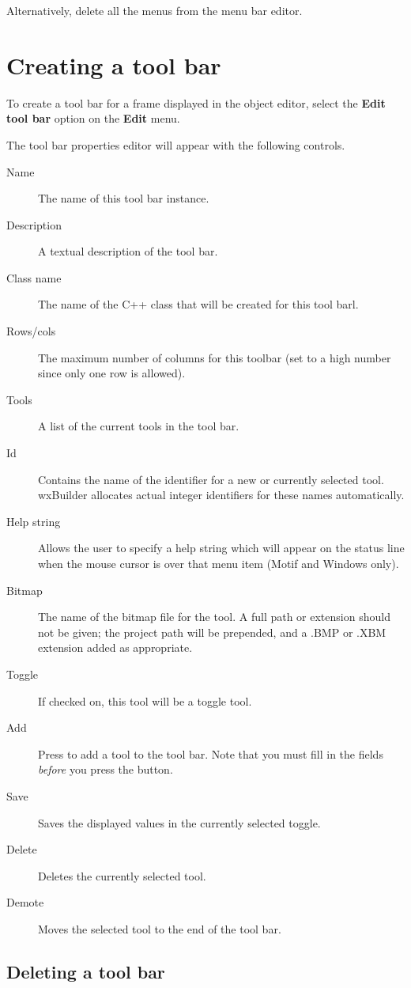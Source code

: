 Alternatively, delete all the menus from the menu bar editor.

\section{Creating a tool bar}

To create a tool bar for a frame displayed in the object editor, select
the {\bf Edit tool bar} option on the {\bf Edit} menu. 

The tool bar properties editor will appear with the following controls.

\begin{description}
\item[Name] The name of this tool bar instance.
\item[Description] A textual description of the tool bar.
\item[Class name] The name of the C++ class that will be created for
this tool barl.
\item[Rows/cols] The maximum number of columns for this toolbar
(set to a high number since only one row is allowed).
\item[Tools] A list of the current tools in the tool bar.
\item[Id] Contains the name of the identifier for a new or currently
selected tool. wxBuilder allocates actual integer identifiers
for these names automatically.
\item[Help string] Allows the user to specify a
help string which will appear on the status line when
the mouse cursor is over that menu item (Motif and Windows only).
\item[Bitmap] The name of the bitmap file for the tool. A full
path or extension should not be given; the project path will be prepended, and
a .BMP or .XBM extension added as appropriate.
\item[Toggle] If checked on, this tool will be a toggle tool.
\item[Add] Press to add a tool to the tool bar. Note that you
must fill in the fields {\it before} you press the button.
\item[Save] Saves the displayed values in the currently selected
toggle.
\item[Delete] Deletes the currently selected tool.
\item[Demote] Moves the selected tool to the end of the tool bar.
\end{description}

\subsection{Deleting a tool bar}

